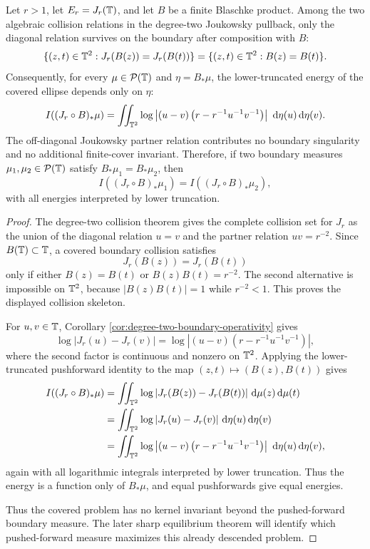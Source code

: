 \begin{theorem}\label{thm:joukowsky-boundary-skeleton-obstruction}
Let \(r>1\), let \(E_r=J_r(\mathbb{T})\), and let \(B\) be a finite Blaschke product.  Among the two algebraic collision relations in the degree-two Joukowsky pullback, only the diagonal relation survives on the boundary after composition with \(B\):
\[
\{(z,t)\in\mathbb{T}^2:J_r(B(z))=J_r(B(t))\}
=
\{(z,t)\in\mathbb{T}^2:B(z)=B(t)\}.
\]
Consequently, for every \(\mu\in\mathcal P(\mathbb{T})\) and \(\eta=B_\ast\mu\), the lower-truncated energy of the covered ellipse depends only on \(\eta\):
\[
I((J_r\circ B)_\ast\mu)
=
\iint_{\mathbb{T}^2}
\log\left|(u-v)\left(r-r^{-1}u^{-1}v^{-1}\right)\right|
\,\,\mathrm{d}\eta(u)\,\mathrm{d}\eta(v).
\]
The off-diagonal Joukowsky partner relation contributes no boundary singularity and no additional finite-cover invariant.  Therefore, if two boundary measures \(\mu_1,\mu_2\in\mathcal P(\mathbb{T})\) satisfy \(B_\ast\mu_1=B_\ast\mu_2\), then
\[
I((J_r\circ B)_\ast\mu_1)=I((J_r\circ B)_\ast\mu_2),
\]
with all energies interpreted by lower truncation.
\end{theorem}

\begin{proof}
The degree-two collision theorem gives the complete collision set for \(J_r\) as the union of the diagonal relation \(u=v\) and the partner relation \(uv=r^{-2}\).  Since \(B(\mathbb{T})\subset\mathbb{T}\), a covered boundary collision satisfies
\[
J_r(B(z))=J_r(B(t))
\]
only if either \(B(z)=B(t)\) or \(B(z)B(t)=r^{-2}\).  The second alternative is impossible on \(\mathbb{T}^2\), because \(|B(z)B(t)|=1\) while \(r^{-2}<1\).  This proves the displayed collision skeleton.

For \(u,v\in\mathbb{T}\), Corollary \ref{cor:degree-two-boundary-operativity} gives
\[
\log|J_r(u)-J_r(v)|=
\log\left|(u-v)\left(r-r^{-1}u^{-1}v^{-1}\right)\right|,
\]
where the second factor is continuous and nonzero on \(\mathbb{T}^2\).  Applying the lower-truncated pushforward identity to the map \((z,t)\mapsto(B(z),B(t))\) gives
\[
\begin{aligned}
I((J_r\circ B)_\ast\mu)
&=\iint_{\mathbb{T}^2}\log|J_r(B(z))-J_r(B(t))|\,\,\mathrm{d}\mu(z)\,\mathrm{d}\mu(t)\\
&=\iint_{\mathbb{T}^2}\log|J_r(u)-J_r(v)|\,\,\mathrm{d}\eta(u)\,\mathrm{d}\eta(v)\\
&=\iint_{\mathbb{T}^2}
\log\left|(u-v)\left(r-r^{-1}u^{-1}v^{-1}\right)\right|
\,\,\mathrm{d}\eta(u)\,\mathrm{d}\eta(v),
\end{aligned}
\]
again with all logarithmic integrals interpreted by lower truncation.  Thus the energy is a function only of \(B_\ast\mu\), and equal pushforwards give equal energies.

Thus the covered problem has no kernel invariant beyond the pushed-forward boundary measure.  The later sharp equilibrium theorem will identify which pushed-forward measure maximizes this already descended problem.
\end{proof}

